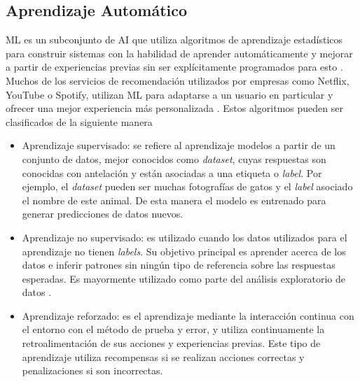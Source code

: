 \subsection{Aprendizaje Automático}
ML es un subconjunto de AI que utiliza algoritmos de aprendizaje estadísticos para construir sistemas con la habilidad de aprender automáticamente y mejorar a partir de experiencias previas sin ser explícitamente programados para esto \cite{ml_def}. Muchos de los servicios de recomendación utilizados por empresas como Netflix, YouTube o Spotify, utilizan ML para adaptarse a un usuario en particular y ofrecer una mejor experiencia más personalizada \cite{ml_apps}. Estos algoritmos pueden ser clasificados de la siguiente manera \cite{ml_types}
\begin{itemize}
	\item Aprendizaje supervisado: se refiere al aprendizaje modelos a partir de un conjunto de datos, mejor conocidos como \textit{dataset}, cuyas respuestas son conocidas con antelación y están asociadas a una etiqueta o \textit{label}. Por ejemplo, el \textit{dataset} pueden ser muchas fotografías de gatos y el \textit{label} asociado el nombre de este animal. De esta manera el modelo es entrenado para generar predicciones de datos nuevos.
	
	\item Aprendizaje no supervisado: es utilizado cuando los datos utilizados para el aprendizaje no tienen \textit{labels}. Su objetivo principal es aprender acerca de los datos e inferir patrones sin ningún tipo de referencia sobre las respuestas esperadas. Es mayormente utilizado como parte del análisis exploratorio de datos \cite{ai_ml_dl}.
	
	\item Aprendizaje reforzado: es el aprendizaje mediante la interacción continua con el entorno con el método de prueba y error, y utiliza continuamente la retroalimentación de sus acciones y experiencias previas. Este tipo de aprendizaje utiliza recompensas si se realizan acciones correctas y penalizaciones si son incorrectas.
\end{itemize}

